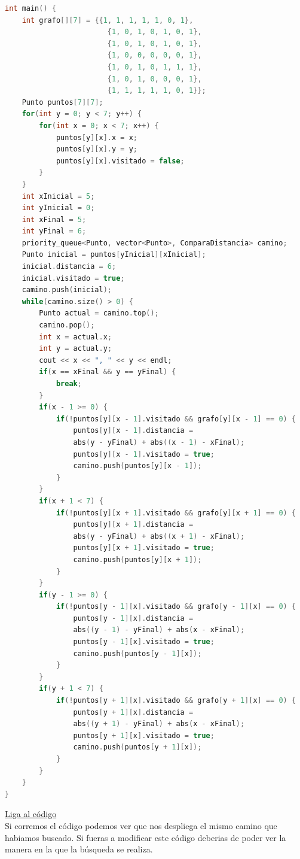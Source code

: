\documentclass{article}
\begin{document}
\begin{lstlisting}[language=C++, caption=A*]
int main() {
    int grafo[][7] = {{1, 1, 1, 1, 1, 0, 1},
                        {1, 0, 1, 0, 1, 0, 1},
                        {1, 0, 1, 0, 1, 0, 1},
                        {1, 0, 0, 0, 0, 0, 1},
                        {1, 0, 1, 0, 1, 1, 1},
                        {1, 0, 1, 0, 0, 0, 1},
                        {1, 1, 1, 1, 1, 0, 1}};
    Punto puntos[7][7];
    for(int y = 0; y < 7; y++) {
        for(int x = 0; x < 7; x++) {
            puntos[y][x].x = x;
            puntos[y][x].y = y;
            puntos[y][x].visitado = false;
        }
    }
    int xInicial = 5;
    int yInicial = 0;
    int xFinal = 5;
    int yFinal = 6;
    priority_queue<Punto, vector<Punto>, ComparaDistancia> camino;
    Punto inicial = puntos[yInicial][xInicial];
    inicial.distancia = 6;
    inicial.visitado = true;
    camino.push(inicial);
    while(camino.size() > 0) {
        Punto actual = camino.top();
        camino.pop();
        int x = actual.x;
        int y = actual.y;
        cout << x << ", " << y << endl;
        if(x == xFinal && y == yFinal) {
            break;
        }
        if(x - 1 >= 0) {
            if(!puntos[y][x - 1].visitado && grafo[y][x - 1] == 0) {
                puntos[y][x - 1].distancia =
                abs(y - yFinal) + abs((x - 1) - xFinal);
                puntos[y][x - 1].visitado = true;
                camino.push(puntos[y][x - 1]);
            }
        }
        if(x + 1 < 7) {
            if(!puntos[y][x + 1].visitado && grafo[y][x + 1] == 0) {
                puntos[y][x + 1].distancia =
                abs(y - yFinal) + abs((x + 1) - xFinal);
                puntos[y][x + 1].visitado = true;
                camino.push(puntos[y][x + 1]);
            }
        }
        if(y - 1 >= 0) {
            if(!puntos[y - 1][x].visitado && grafo[y - 1][x] == 0) {
                puntos[y - 1][x].distancia =
                abs((y - 1) - yFinal) + abs(x - xFinal);
                puntos[y - 1][x].visitado = true;
                camino.push(puntos[y - 1][x]);
            }
        }
        if(y + 1 < 7) {
            if(!puntos[y + 1][x].visitado && grafo[y + 1][x] == 0) {
                puntos[y + 1][x].distancia =
                abs((y + 1) - yFinal) + abs(x - xFinal);
                puntos[y + 1][x].visitado = true;
                camino.push(puntos[y + 1][x]);
            }
        }
    }
}
\end{lstlisting}
\href{https://repl.it/@Jamesscn/A}{Liga al código} \\

Si corremos el código podemos ver que nos despliega el mismo camino que habiamos buscado. Si fueras a modificar este código deberias de poder ver la manera en la que la búsqueda se realiza.
\end{document}
